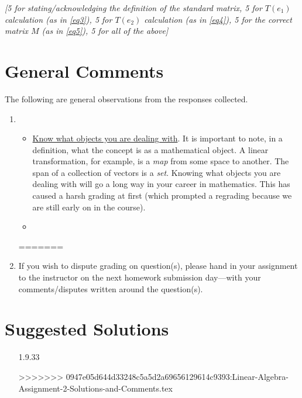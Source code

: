 \documentclass[answers,11pt]{exam}
\theoremstyle{definition}
\theoremstyle{definition}
\DeclareMathOperator{\1}{\mathbbm{1}}
\begin{document}
\begin{questions}
\begin{solution}
	
	\textit{[5 for stating/acknowledging the definition of the standard matrix, 5 for $T(e_1)$ calculation (as in \eqref{eq3}), 5 for $T(e_2)$ calculation (as in \eqref{eq4}), 5 for the correct matrix $M$ (as in \eqref{eq5}), 5 for all of the above]}
\end{solution}

\end{questions}


\clearpage


\section*{General Comments}
The following are general observations from the responses collected.


\begin{enumerate}
	\item \begin{itemize}
		
		\item \uline{Know what objects you are dealing with}. It is important to note, in a definition, what the concept is as a mathematical object. A linear transformation, for example, is a \textit{map} from some space to another. The span of a collection of vectors is a \textit{set}. Knowing what objects you are dealing with will go a long way in your career in mathematics. This has caused a harsh grading at first (which prompted a regrading because we are still early on in the course).
		
		\item 
	\end{itemize}
	
=======
	\item If you wish to dispute grading on question(s), please hand in your assignment to the instructor on the next homework submission day---with your comments/disputes written around the question(s).
	
\end{enumerate}



\clearpage

\section*{Suggested Solutions}

\bigskip

\begin{enumerate}[itemsep = 1.5mm]
	
	\item[1.9.33]
	
>>>>>>> 0947e05d644d33248c5a5d2a69656129614c9393:Linear-Algebra-Assignment-2-Solutions-and-Comments.tex
\end{enumerate}
\end{document}
